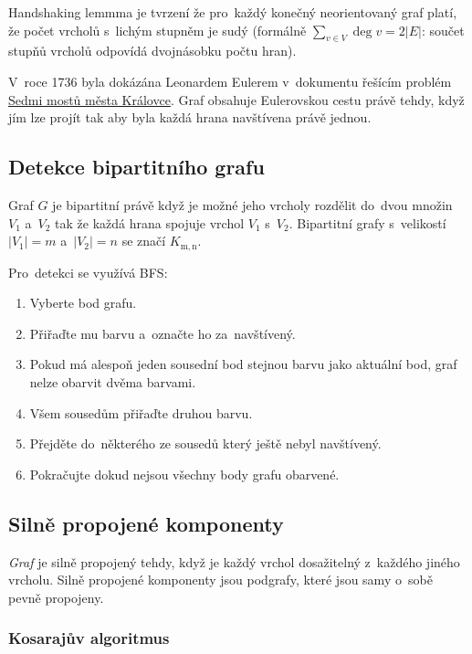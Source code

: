Handshaking lemmma je tvrzení že pro~každý konečný neorientovaný graf platí, že počet vrcholů s~lichým stupněm je sudý (formálně $\sum_{v \in V} \deg v = 2 |E|$: součet stupňů vrcholů odpovídá dvojnásobku počtu hran).

V~roce 1736 byla dokázána Leonardem Eulerem v~dokumentu řešícím problém \href{https://cs.wikipedia.org/wiki/Sedm_most%C5%AF_m%C4%9Bsta_Kr%C3%A1lovce}{Sedmi mostů města Královce}.
Graf obsahuje Eulerovskou cestu právě tehdy, když jím lze projít tak aby byla každá hrana navštívena právě jednou.

\subsection{Detekce bipartitního grafu}

Graf $G$ je bipartitní právě když je možné jeho vrcholy rozdělit do~dvou množin $V_1$ a~$V_2$ tak že každá hrana spojuje vrchol $V_1$ s~$V_2$.
Bipartitní grafy s~velikostí $|V_1|=m$ a~$|V_2|=n$ se značí $K_\mathrm{m,n}$.

Pro~detekci se využívá BFS:

\begin{enumerate}
\item Vyberte bod grafu.
\item Přiřaďte mu barvu a~označte ho za~navštívený.
\item Pokud má alespoň jeden sousední bod stejnou barvu jako aktuální bod, graf nelze obarvit dvěma barvami.
\item Všem sousedům přiřaďte druhou barvu.
\item Přejděte do~některého ze sousedů který ještě nebyl navštívený.
\item Pokračujte dokud nejsou všechny body grafu obarvené.
\end{enumerate}

\subsection{Silně propojené komponenty}

\emph{Graf} je silně propojený tehdy, když je každý vrchol dosažitelný z~každého jiného vrcholu.
Silně propojené komponenty jsou podgrafy, které jsou samy o~sobě pevně propojeny.

\subsubsection{Kosarajův algoritmus}

